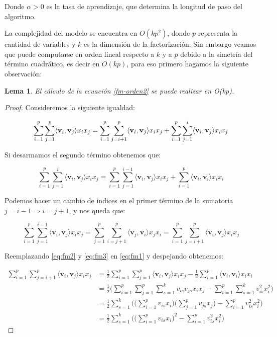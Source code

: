 \documentclass[hidelinks,12pt,a4paper]{book}
\providecommand{\prodint}[1]{\langle#1\rangle}
\theoremstyle{plain}
\newtheorem{lemma}[theorem]{Lema}
\theoremstyle{definition}
\begin{document}
Donde $\alpha>0$ es la tasa de aprendizaje, que determina la longitud de paso del algoritmo. 

La complejidad del modelo se encuentra en $O(kp^2)$, donde $p$ representa la cantidad de variables y $k$ es la dimensión de la factorización. Sin embargo veamos que puede computarse en orden lineal respecto a $k$ y a $p$ debido a la simetría del término cuadrático, es decir en $O(kp)$, para eso primero hagamos la siguiente observación:

\begin{lemma}
\label{fm-lema}
El cálculo de la ecuación \eqref{fm-orden2} se puede realizar en O(kp).
\end{lemma}

\begin{proof}
Consideremos la siguiente igualdad:

\begin{equation}
\label{eq:fm1}
\sum_{i=1}^p \sum_{j=1}^p \prodint{\mathbf{v}_i,\mathbf{v}_j} x_i x_j = \sum_{i=1}^p \sum_{j=i+1}^p \prodint{\mathbf{v}_i,\mathbf{v}_j} x_i x_j + \sum_{i=1}^p \sum_{j=1}^i \prodint{\mathbf{v}_i,\mathbf{v}_j} x_i x_j\\
\end{equation}

Si desarmamos el segundo término obtenemos que:

\begin{equation}
\label{eq:fm2}
\sum_{i=1}^p \sum_{j=1}^{i} \prodint{\mathbf{v}_i,\mathbf{v}_j} x_i x_j = \sum_{i=1}^p \sum_{j=1}^{i-1} \prodint{\mathbf{v}_i,\mathbf{v}_j} x_i x_j + \sum_{i=1}^p \prodint{\mathbf{v}_i,\mathbf{v}_i} x_i x_i
\end{equation}

Podemos hacer un cambio de indices en el primer término de la sumatoria $j=i-1 \Rightarrow i=j+1$, y nos queda que:

\begin{equation}
\label{eq:fm3}
\sum_{i=1}^p \sum_{j=1}^{i-1} \prodint{\mathbf{v}_i,\mathbf{v}_j} x_i x_j = \sum_{j=1}^p \sum_{i=j+1}^{p} \prodint{\mathbf{v}_j,\mathbf{v}_i} x_j x_i = \sum_{i=1}^p \sum_{j=i+1}^p \prodint{\mathbf{v}_i,\mathbf{v}_j} x_i x_j 
\end{equation}

Reemplazando \eqref{eq:fm2} y \eqref{eq:fm3} en \eqref{eq:fm1} y despejando obtenemos:

\begin{align}
\sum_{i=1}^p \sum_{j=i+1}^p \prodint{\mathbf{v}_i,\mathbf{v}_j} x_i x_j & = \frac{1}{2} \sum_{i=1}^p \sum_{j=1}^p \prodint{\mathbf{v}_i,\mathbf{v}_j} x_i x_j - \frac{1}{2} \sum_{i=1}^p \prodint{\mathbf{v}_i,\mathbf{v}_i} x_i x_i\\
& = \frac{1}{2} \big( \sum_{i=1}^p \sum_{j=1}^p \sum_{s=1}^k v_{is} v_{js} x_{i} x_j -\sum_{i=1}^p  \sum_{s=1}^k v_{is}^2 x_i^2 \big)\\
& = \frac{1}{2} \sum_{s=1}^k \big( \big( \sum_{i=1}^p v_{is} x_i \big) \big( \sum_{j=1}^p v_{js} x_j \big) - \sum_{i=1}^p  v_{is}^2 x_i^2 \big)\\
& = \frac{1}{2} \sum_{s=1}^k \big( \big( \sum_{i=1}^p v_{is} x_i \big)^2 - \sum_{i=1}^p  v_{is}^2 x_i^2 \big)
\end{align}


\end{proof}
\end{document}
